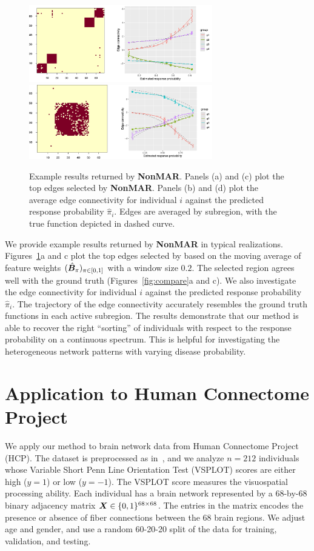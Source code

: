 \documentclass[11pt]{article}
\theoremstyle{definition}
\def\NonparaM{\text{\bf \small NonMAR }}
\begin{document}
\begin{figure}[ht]
    \centering
   \includegraphics[width=8cm]{F10.pdf}
          \includegraphics[width=8cm]{F14.pdf}
 \caption{Example results returned by {\bf \small NonMAR}. Panels (a) and (c) plot the top edges selected by {\bf \small NonMAR}. Panels (b) and (d) plot the average edge connectivity for individual $i$ against the predicted response probability $\hat \pi_i$. Edges are averaged by subregion, with the true function depicted in dashed curve.}\label{fig:compare2}
\end{figure}


We provide example results returned by {\bf \small NonMAR} in typical realizations. Figures~\ref{fig:compare2}a and c plot the top edges selected by \NonparaM based on the moving average of feature weights $(\hat {\bm B}_\pi)_{\pi\in[0,1]}$ with a window size $0.2$. The selected region agrees well with the ground truth (Figures~\ref{fig:compare}a and c). We also investigate the edge connectivity for individual $i$ against the predicted response probability $\hat \pi_i$. The trajectory of the edge connectivity accurately resembles the ground truth functions in each active subregion. The results demonstrate that our method is able to recover the right ``sorting'' of individuals with respect to the response probability on a continuous spectrum. This is helpful for investigating the heterogeneous network patterns with varying disease probability. 

\section{Application to Human Connectome Project}

We apply our method to brain network data from Human Connectome Project (HCP). The dataset is preprocessed as in~\cite{wang2017common}, and we analyze $n=212$ individuals whose Variable Short Penn Line Orientation Test (VSPLOT) scores are either high ($y=1$) or low ($y=-1$). The VSPLOT score measures the visuospatial processing ability. Each individual has a brain network represented by a 68-by-68 binary adjacency matrix $\bm X\in\{0,1\}^{68\times 68}$. The entries in the matrix encodes the presence or absence of fiber connections between the 68 brain regions. We adjust age and gender, and use a random 60-20-20 split of the data for training, validation, and testing. 
\end{document}
